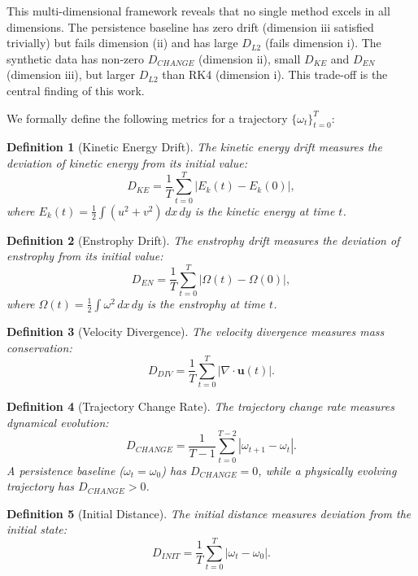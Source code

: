\documentclass[reprint,aps,pre]{revtex4-2}
\newtheorem{definition}{Definition}
\begin{document}
This multi-dimensional framework reveals that no single method excels in all dimensions. The persistence baseline has zero drift (dimension iii satisfied trivially) but fails dimension (ii) and has large $D_{L2}$ (fails dimension i). The synthetic data has non-zero $D_{CHANGE}$ (dimension ii), small $D_{KE}$ and $D_{EN}$ (dimension iii), but larger $D_{L2}$ than RK4 (dimension i). This trade-off is the central finding of this work.

We formally define the following metrics for a trajectory $\{\omega_t\}_{t=0}^{T}$:

\begin{definition}[Kinetic Energy Drift]
The kinetic energy drift measures the deviation of kinetic energy from its initial value:
\begin{equation}
D_{KE} = \frac{1}{T}\sum_{t=0}^{T} |E_k(t) - E_k(0)|,
\end{equation}
where $E_k(t) = \frac{1}{2}\int (u^2 + v^2)\,dx\,dy$ is the kinetic energy at time $t$.
\end{definition}

\begin{definition}[Enstrophy Drift]
The enstrophy drift measures the deviation of enstrophy from its initial value:
\begin{equation}
D_{EN} = \frac{1}{T}\sum_{t=0}^{T} |\Omega(t) - \Omega(0)|,
\end{equation}
where $\Omega(t) = \frac{1}{2}\int \omega^2\,dx\,dy$ is the enstrophy at time $t$.
\end{definition}

\begin{definition}[Velocity Divergence]
The velocity divergence measures mass conservation:
\begin{equation}
D_{DIV} = \frac{1}{T}\sum_{t=0}^{T} |\nabla \cdot \mathbf{u}(t)|.
\end{equation}
\end{definition}

\begin{definition}[Trajectory Change Rate]
The trajectory change rate measures dynamical evolution:
\begin{equation}
D_{CHANGE} = \frac{1}{T-1}\sum_{t=0}^{T-2} |\omega_{t+1} - \omega_t|.
\end{equation}
A persistence baseline ($\omega_t = \omega_0$) has $D_{CHANGE} = 0$, while a physically evolving trajectory has $D_{CHANGE} > 0$.
\end{definition}

\begin{definition}[Initial Distance]
The initial distance measures deviation from the initial state:
\begin{equation}
D_{INIT} = \frac{1}{T}\sum_{t=0}^{T} |\omega_t - \omega_0|.
\end{equation}
\end{definition}
\end{document}

